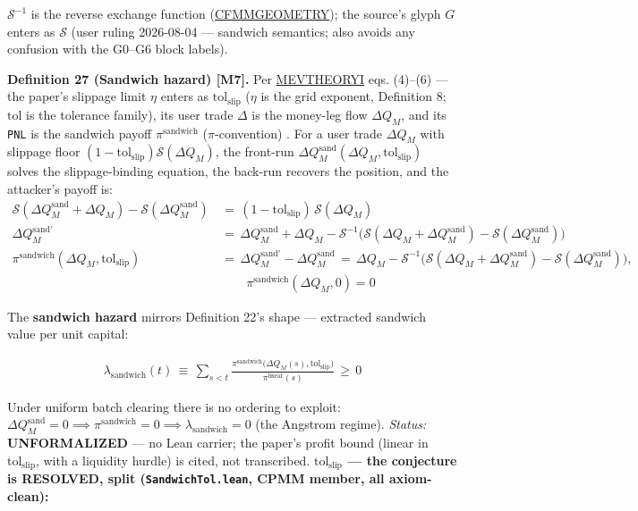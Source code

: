 \documentclass[11pt]{article}
\renewcommand{\_}{\textunderscore\allowbreak}
\begin{document}
\(\mathcal{S}^{-1}\) is the reverse exchange function (\href{../refs/cfmm/angeris-geometry_of_cfmms-2023.pdf}{CFMM\_GEOMETRY}); the source's glyph \(G\) enters as \(\mathcal{S}\) (user ruling 2026-08-04 --- sandwich semantics; also avoids any confusion with the G0--G6 block labels).

\textbf{Definition 27 (Sandwich hazard) {[}M7{]}.} Per \href{../refs/mev/KulkarniDiamandisChitraTheoryMEV1.pdf}{MEV\_THEORY\_I} eqs. (4)--(6) --- the paper's slippage limit \(\eta\) enters as \(\mathrm{tol}_{\text{slip}}\) (\(\eta\) is the grid exponent, Definition 8; \(\mathrm{tol}\) is the tolerance family), its user trade \(\Delta\) is the money-leg flow \(\Delta Q_M\), and its \texttt{PNL} is the sandwich payoff \(\pi^{\text{sandwich}}\) (\(\pi\)-convention) . For a user trade \(\Delta Q_M\) with slippage floor \((1-\mathrm{tol}_{\text{slip}})\mathcal{S}(\Delta Q_M)\), the front-run \(\Delta Q_M^{\text{sand}}(\Delta Q_M, \mathrm{tol}_{\text{slip}})\) solves the slippage-binding equation, the back-run recovers the position, and the attacker's payoff is: \[
    \begin{aligned}
        \mathcal{S}(\Delta Q_M^{\text{sand}} + \Delta Q_M) - \mathcal{S}(\Delta Q_M^{\text{sand}}) \, &= \, (1-\mathrm{tol}_{\text{slip}})\,\mathcal{S}(\Delta Q_M) \\[4pt]
        \Delta Q_M^{\text{sand}\prime} \, &= \, \Delta Q_M^{\text{sand}} + \Delta Q_M - \mathcal{S}^{-1}\big(\mathcal{S}(\Delta Q_M + \Delta Q_M^{\text{sand}}) - \mathcal{S}(\Delta Q_M^{\text{sand}})\big) \\[4pt]
        \pi^{\text{sandwich}}(\Delta Q_M, \mathrm{tol}_{\text{slip}}) \, &= \, \Delta Q_M^{\text{sand}\prime} - \Delta Q_M^{\text{sand}} \, = \, \Delta Q_M - \mathcal{S}^{-1}\big(\mathcal{S}(\Delta Q_M + \Delta Q_M^{\text{sand}}) - \mathcal{S}(\Delta Q_M^{\text{sand}})\big), \\[4pt] &\qquad \pi^{\text{sandwich}}(\Delta Q_M, 0) = 0
    \end{aligned}
\]

The \textbf{sandwich hazard} mirrors Definition 22's shape --- extracted sandwich value per unit capital:

\[
    \begin{aligned}
        \lambda_{\text{sandwich}}(t) \, \equiv \, \sum_{s<t} \frac{\pi^{\text{sandwich}}\big(\Delta Q_M(s), \mathrm{tol}_{\text{slip}}\big)}{\pi^{\text{linear}}(s)} \, \geq \, 0
    \end{aligned}
\]

Under uniform batch clearing there is no ordering to exploit: \(\Delta Q_M^{\text{sand}} = 0 \implies \pi^{\text{sandwich}} = 0 \implies \lambda_{\text{sandwich}} = 0\) (the Angstrom regime). \emph{Status:} \textbf{UNFORMALIZED} --- no Lean carrier; the paper's profit bound (linear in \(\mathrm{tol}_{\text{slip}}\), with a liquidity hurdle) is cited, not transcribed. \textbf{\(\mathrm{tol}_{\text{slip}}\) --- the conjecture is RESOLVED, split (\texttt{SandwichTol.lean}, CPMM member, all axiom-clean):}
\end{document}
